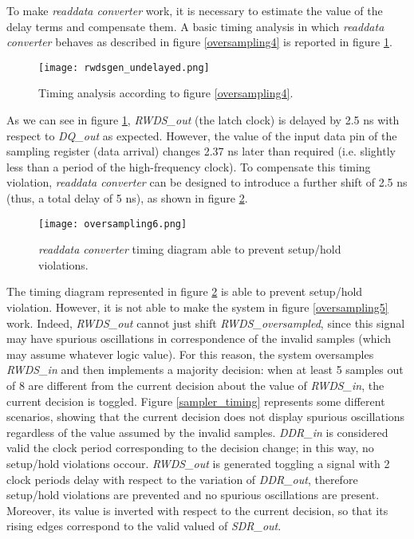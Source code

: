 \documentclass[10pt, english, a4paper, titlepage, oneside]{book}
\begin{document}
\vspace{4mm}
\noindent To make \textit{readdata converter} work, it is necessary to estimate the value of the delay terms and compensate them. A basic timing analysis in which \textit{readdata converter} behaves as described in figure \ref{oversampling4} is reported in figure \ref{rwdsgen_undelayed}.
\vspace{4mm}
\begin{figure}[H]
    \centering
    \captionsetup{width=16cm}
    \texttt{[image: rwdsgen\_undelayed.png]}
    \vspace{4mm}
    \caption{\centering Timing analysis according to figure \ref{oversampling4}.}
    \label{rwdsgen_undelayed}
\end{figure}
\vspace{4mm}
\noindent As we can see in figure \ref{rwdsgen_undelayed}, \textit{RWDS\_out} (the latch clock) is delayed by 2.5 ns with respect to \textit{DQ\_out} as expected. However, the value of the input data pin of the sampling register (data arrival) changes 2.37 ns later than required (i.e. slightly less than a period of the high-frequency clock). To compensate this timing violation, \textit{readdata converter} can be designed to introduce a further shift of 2.5 ns (thus, a total delay of 5 ns), as shown in figure \ref{oversampling6}.
\vspace{6mm}
\begin{figure}[H]
    \centering
    \captionsetup{width=15cm}
    \texttt{[image: oversampling6.png]}
    \vspace{2mm}
    \caption{\centering \textit{readdata converter} timing diagram able to prevent setup/hold violations.}
    \label{oversampling6}
\end{figure}
\vspace{4mm}
\noindent The timing diagram represented in figure \ref{oversampling6} is able to prevent setup/hold violation. However, it is not able to make the system in figure \ref{oversampling5} work. Indeed, \textit{RWDS\_out} cannot just shift \textit{RWDS\_oversampled}, since this signal may have spurious oscillations in correspondence of the invalid samples (which may assume whatever logic value). For this reason, the system oversamples \textit{RWDS\_in} and then implements a majority decision: when at least 5 samples out of 8 are different from the current decision about the value of \textit{RWDS\_in}, the current decision is toggled. Figure \ref{sampler_timing} represents some different scenarios, showing that the current decision does not display spurious oscillations regardless of the value assumed by the invalid samples. \textit{DDR\_in} is considered valid the clock period corresponding to the decision change; in this way, no setup/hold violations occour. \textit{RWDS\_out} is generated toggling a signal with 2 clock periods delay with respect to the variation of \textit{DDR\_out}, therefore setup/hold violations are prevented and no spurious oscillations are present. Moreover, its value is inverted with respect to the current decision, so that its rising edges correspond to the valid valued of \textit{SDR\_out}.
\end{document}
